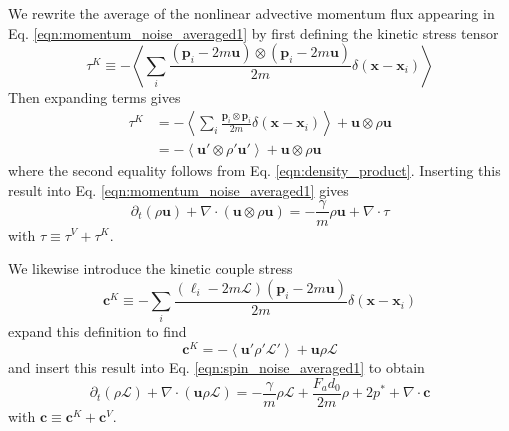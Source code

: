 \documentclass[%
 reprint,
superscriptaddress,
longbibliography,
 amsmath,amssymb,
 prl,
 citeautoscript,
]{revtex4-1}
\begin{document}
We rewrite the average of the nonlinear advective momentum flux appearing in Eq. \ref{eqn:momentum_noise_averaged1} by first defining the kinetic stress tensor
\begin{equation}
\tau^K \equiv - \left\langle \sum_i \frac{\left( {\boldsymbol p}_i - 2 m {\boldsymbol u} \right) \otimes \left( {\boldsymbol p}_i - 2 m {\boldsymbol u} \right) }{2m} \delta \left( {\boldsymbol x} - {\boldsymbol x}_i \right) \right\rangle
\label{eqn:tauk_defn}
\end{equation}
Then expanding terms gives
\[
\begin{split}
\tau^K &= - \left\langle \sum_i \frac{{\boldsymbol p}_i \otimes {\boldsymbol p}_i}{2 m} \delta \left( {\boldsymbol x} - {\boldsymbol x}_i \right) \right\rangle + {\boldsymbol u} \otimes \rho {\boldsymbol u} \\
&= - \left\langle {\boldsymbol u}' \otimes \rho' {\boldsymbol u}' \right\rangle + {\boldsymbol u} \otimes \rho {\boldsymbol u}
\end{split}
\]
where the second equality follows from Eq. \ref{eqn:density_product}. Inserting this result into Eq. \ref{eqn:momentum_noise_averaged1} gives
\begin{equation}
\partial_t \left( \rho {\boldsymbol u} \right) + \nabla \cdot \left( {\boldsymbol u} \otimes \rho {\boldsymbol u} \right) = - \frac{\gamma}{m} \rho {\boldsymbol u} + \nabla \cdot \tau
\label{eqn:momentum_noise_averaged2}
\end{equation}
with $\tau \equiv \tau^V + \tau^K$.

We likewise introduce the kinetic couple stress
\begin{equation}
{\boldsymbol c}^K \equiv - \sum_i \frac{\left( \ell_i - 2 m \mathcal{L} \right) \left( {\boldsymbol p}_i - 2 m {\boldsymbol u} \right)}{2m} \delta \left( {\boldsymbol x} - {\boldsymbol x}_i \right)
\label{eqn:cK_defn}
\end{equation}
expand this definition to find
\[
{\boldsymbol c}^K = - \left\langle {\boldsymbol u}' \rho' \mathcal{L}' \right\rangle + {\boldsymbol u} \rho \mathcal{L}
\]
and insert this result into Eq. \ref{eqn:spin_noise_averaged1} to obtain
\begin{equation}
\partial_t \left( \rho \mathcal{L} \right) + \nabla \cdot \left( {\boldsymbol u} \rho \mathcal{L} \right) = - \frac{\gamma}{m} \rho \mathcal{L} + \frac{F_a d_0}{2 m} \rho + 2 p^* + \nabla \cdot {\boldsymbol c}
\label{eqn:spin_noise_averaged2}
\end{equation}
with ${\boldsymbol c} \equiv {\boldsymbol c}^K + {\boldsymbol c}^V$.
\end{document}
